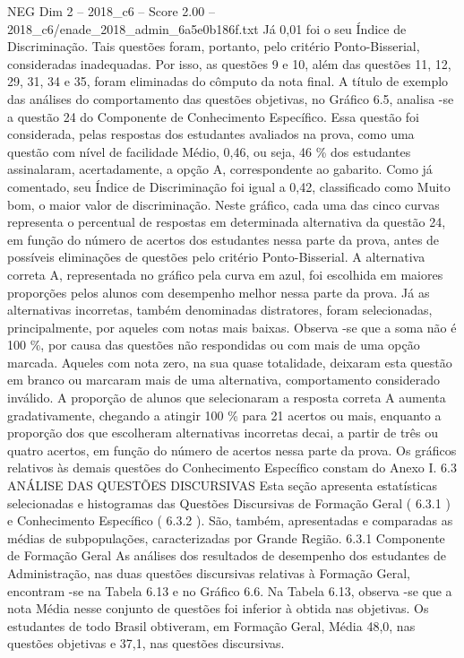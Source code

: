 \begin{textsample}{NEG Dim 2 – 2018\_c6 – Score 2.00 – 2018\_c6/enade\_2018\_admin\_6a5e0b186f.txt}
Já 0,01 foi o seu Índice de Discriminação.
Tais questões foram, portanto, pelo critério Ponto-Bisserial, consideradas inadequadas.
Por isso, as questões 9 e 10, além das questões 11, 12, 29, 31, 34 e 35, foram eliminadas do cômputo da nota final.
A título de exemplo das análises do comportamento das questões objetivas, no Gráfico 6.5, analisa -se a questão 24 do Componente de Conhecimento Específico.
Essa questão foi considerada, pelas respostas dos estudantes avaliados na prova, como uma questão com nível de facilidade Médio, 0,46, ou seja, 46 \% dos estudantes assinalaram, acertadamente, a opção A, correspondente ao gabarito.
Como já comentado, seu Índice de Discriminação foi igual a 0,42, classificado como Muito bom, o maior valor de discriminação.
Neste gráfico, cada uma das cinco curvas representa o percentual de respostas em determinada alternativa da questão 24, em função do número de acertos dos estudantes nessa parte da prova, antes de possíveis eliminações de questões pelo critério Ponto-Bisserial.
A alternativa correta A, representada no gráfico pela curva em azul, foi escolhida em maiores proporções pelos alunos com desempenho melhor nessa parte da prova.
Já as alternativas incorretas, também denominadas distratores, foram selecionadas, principalmente, por aqueles com notas mais baixas.
Observa -se que a soma não é 100 \%, por causa das questões não respondidas ou com mais de uma opção marcada.
Aqueles com nota zero, na sua quase totalidade, deixaram esta questão em branco ou marcaram mais de uma alternativa, comportamento considerado inválido.
A proporção de alunos que selecionaram a resposta correta A aumenta gradativamente, chegando a atingir 100 \% para 21 acertos ou mais, enquanto a proporção dos que escolheram alternativas incorretas decai, a partir de três ou quatro acertos, em função do número de acertos nessa parte da prova.
Os gráficos relativos às demais questões do Conhecimento Específico constam do Anexo I. 6.3 ANÁLISE DAS QUESTÕES DISCURSIVAS Esta seção apresenta estatísticas selecionadas e histogramas das Questões Discursivas de Formação Geral ( 6.3.1 ) e Conhecimento Específico ( 6.3.2 ).
São, também, apresentadas e comparadas as médias de subpopulações, caracterizadas por Grande Região. 6.3.1 Componente de Formação Geral As análises dos resultados de desempenho dos estudantes de Administração, nas duas questões discursivas relativas à Formação Geral, encontram -se na Tabela 6.13 e no Gráfico 6.6.
Na Tabela 6.13, observa -se que a nota Média nesse conjunto de questões foi inferior à obtida nas objetivas.
Os estudantes de todo Brasil obtiveram, em Formação Geral, Média 48,0, nas questões objetivas e 37,1, nas questões discursivas.

\end{textsample}
